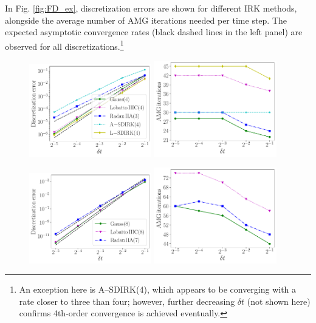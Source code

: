 \documentclass[review]{siamart}
\begin{document}
In Fig. \ref{fig:FD_ex}, discretization errors are shown for different IRK
methods, alongside the average number of AMG iterations needed per time step.
The expected asymptotic convergence rates (black dashed lines in the left panel)
are observed for all discretizations.\footnote{An exception here is A--SDIRK(4),
which appears to be converging with a rate closer to three than four; however,
further decreasing $\delta t$ (not shown here) confirms 4th-order convergence
is achieved eventually.}

\begin{figure}[!htb]
\centerline{
\includegraphics[width = 0.475\textwidth]{figures/FD_ex/errors_iters_14_34_23_-14_4_d2_ex1.pdf}
\quad
\includegraphics[width = 0.475\textwidth]{figures/FD_ex/amg_iters_14_34_23_-14_4_d2_ex1.pdf}
}
\centerline{
\includegraphics[width = 0.475\textwidth]{figures/FD_ex/errors_iters_18_38_27_d2_ex1.pdf}
\quad
\includegraphics[width = 0.475\textwidth]{figures/FD_ex/amg_iters_18_38_27_d2_ex1.pdf}
}
\end{figure}
\end{document}
